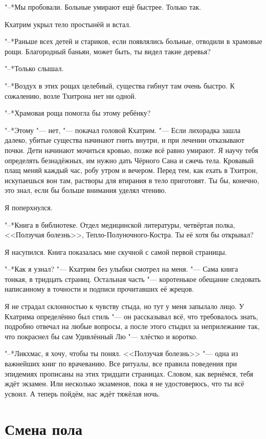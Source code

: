 "--*Мы пробовали.
Больные умирают ещё быстрее.
Только так.

Кхатрим укрыл тело простынёй и встал.

"--*Раньше всех детей и стариков, если появлялись больные, отводили в храмовые рощи.
Благородный баньян, может быть, ты видел такие деревья?

"--*Только слышал.

"--*Воздух в этих рощах целебный, существа гибнут там очень быстро.
К сожалению, возле Тхитрона нет ни одной.

"--*Храмовая роща помогла бы этому ребёнку?

"--*Этому "--- нет, "--- покачал головой Кхатрим.
"--- Если лихорадка зашла далеко, убитые существа начинают гнить внутри, и при лечении отказывают почки.
Дети начинают мочиться кровью, позже всё равно умирают.
Я научу тебя определять безнадёжных, им нужно дать Чёрного Сана и сжечь тела.
Кровавый плащ меняй каждый час, робу утром и вечером.
Перед тем, как ехать в Тхитрон, искупаешься вон там, растворы для втирания в тело приготовят.
Ты бы, конечно, это знал, если бы больше внимания уделял чтению.

Я поперхнулся.

"--*Книга в библиотеке.
Отдел медицинской литературы, четвёртая полка, <<Ползучая болезнь>>, Тепло-Полуночного-Костра.
Ты её хотя бы открывал?

Я насупился.
Книга показалась мне скучной с самой первой страницы.

"--*Как я узнал? "--- Кхатрим без улыбки смотрел на меня.
"--- Сама книга тонкая, в тридцать страниц.
Остальная часть "--- коротенькое обещание следовать написанному в точности и подписи прочитавших её жрецов.

Я не страдал склонностью к чувству стыда, но тут у меня запылало лицо.
У Кхатрима определённо был стиль "--- он рассказывал всё, что требовалось знать, подробно отвечал на любые вопросы, а после этого стыдил за неприлежание так, что покраснел бы сам Удивлённый Лю "--- хлёстко и коротко.

"--*Ликхмас, я хочу, чтобы ты понял.
<<Ползучая болезнь>> "--- одна из важнейших книг по врачеванию.
Все ритуалы, все правила поведения при эпидемиях прописаны на этих тридцати страницах.
Словом, как вернёмся, тебя ждёт экзамен.
Или несколько экзаменов, пока я не удостоверюсь, что ты всё усвоил.
А теперь пойдём, нас ждёт тяжёлая ночь.

\section{Смена пола}

